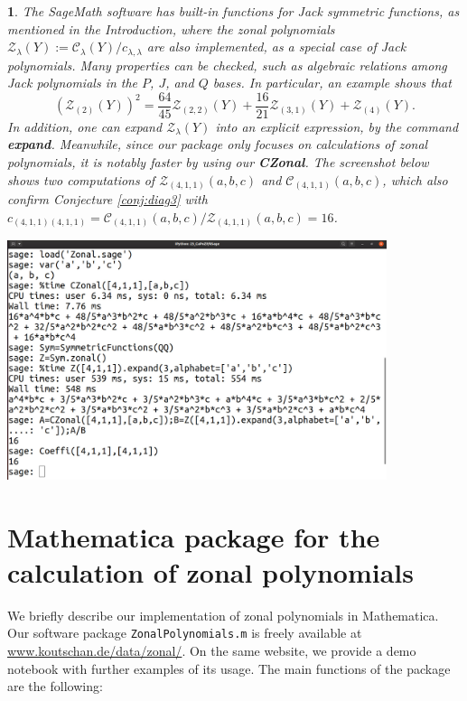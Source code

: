 \documentclass[smallextended]{svjour3}
\newtheorem{rem}[thm]{\protect\remarkname}
\providecommand{\remarkname}{Remark}
\begin{document}
\begin{rem}
The SageMath software has built-in functions for Jack symmetric
functions, as mentioned in the Introduction,
where the zonal polynomials
$\mathcal{Z}_{\lambda}(Y):=\mathcal{C}_\lambda(Y)/c_{\lambda,\lambda}$ are also
implemented, as a special case of Jack polynomials. Many properties can be
checked, such as algebraic relations among Jack polynomials in the $P$, $J$, and
$Q$ bases. In particular, an example shows that
\[
  \left(\mathcal{Z}_{(2)}(Y)\right)^2=\frac{64}{45}\mathcal{Z}_{(2, 2)}(Y) +
  \frac{16}{21}\mathcal{Z}_{(3, 1)}(Y) + \mathcal{Z}_{(4)}(Y).
\]
In addition, one can expand $\mathcal{Z}_{\lambda}(Y)$ into an explicit expression, by
the command \textbf{expand}. Meanwhile, since our package only focuses on
calculations of zonal polynomials, it is notably faster by using our
\textbf{CZonal}. The screenshot below shows two computations of
$\mathcal{Z}_{(4,1,1)}(a,b,c)$ and $\mathcal{C}_{(4,1,1)}(a,b,c)$,
which also confirm
Conjecture \ref{conj:diag3} with $c_{(4,1,1)(4,1,1)}=
\mathcal{C}_{(4,1,1)}(a,b,c)/\mathcal{Z}_{(4,1,1)}(a,b,c)=16$.
\begin{center}
\includegraphics[width=\textwidth, height=7cm]{Screenshot.jpg}
\end{center}
\end{rem}


\section{Mathematica package for the calculation of zonal polynomials}\label{sec:mma}

We briefly describe our implementation of zonal polynomials in Mathematica.
Our software package \texttt{ZonalPolynomials.m} is freely available at
\url{www.koutschan.de/data/zonal/}.  On the same website, we provide a
demo notebook with further examples of its usage. The main functions of the
package are the following:
\medskip
\end{document}
